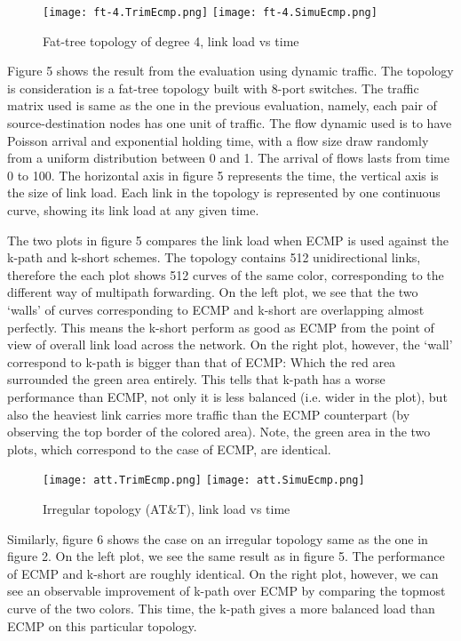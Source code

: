 \documentclass[conference]{IEEEtran}
\begin{document}
\begin{figure}
\centering\texttt{[image: ft-4.TrimEcmp.png]}
\centering\texttt{[image: ft-4.SimuEcmp.png]}
\caption{Fat-tree topology of degree 4, link load vs time}
\end{figure}

Figure 5 shows the result from the evaluation using dynamic traffic. The
topology is consideration is a fat-tree topology built with 8-port switches.
The traffic matrix used is same as the one in the previous evaluation, namely,
each pair of source-destination nodes has one unit of traffic. The flow dynamic
used is to have Poisson arrival and exponential holding time, with a flow size
draw randomly from a uniform distribution between 0 and 1. The arrival of flows
lasts from time 0 to 100. The horizontal axis in figure 5 represents the time,
the vertical axis is the size of link load. Each link in the topology is
represented by one continuous curve, showing its link load at any given time.

The two plots in figure 5 compares the link load when ECMP is used against the
k-path and k-short schemes. The topology contains 512 unidirectional links,
therefore the each plot shows 512 curves of the same color, corresponding to
the different way of multipath forwarding. On the left plot, we see that the
two `walls' of curves corresponding to ECMP and k-short are overlapping almost
perfectly. This means the k-short perform as good as ECMP from the point of
view of overall link load across the network. On the right plot, however, the
`wall' correspond to k-path is bigger than that of ECMP: Which the red area
surrounded the green area entirely. This tells that k-path has a worse
performance than ECMP, not only it is less balanced (i.e. wider in the plot),
but also the heaviest link carries more traffic than the ECMP counterpart (by
observing the top border of the colored area). Note, the green area in the two
plots, which correspond to the case of ECMP, are identical.

\begin{figure}[h]
\centering\texttt{[image: att.TrimEcmp.png]}
\centering\texttt{[image: att.SimuEcmp.png]}
\caption{Irregular topology (AT\&T), link load vs time}
\end{figure}

Similarly, figure 6 shows the case on an irregular topology same as the one in
figure 2. On the left plot, we see the same result as in figure 5. The
performance of ECMP and k-short are roughly identical. On the right plot,
however, we can see an observable improvement of k-path over ECMP by comparing
the topmost curve of the two colors. This time, the k-path gives a more
balanced load than ECMP on this particular topology.
\end{document}
